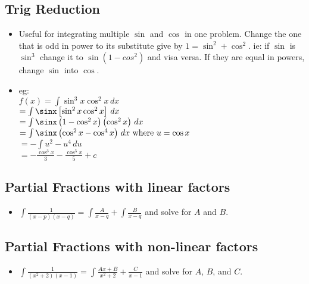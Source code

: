  \subsection{\color{BrickRed}Trig Reduction}
  \begin{multicols}{2}
  \begin{itemize}
    \item Useful for integrating multiple $\sin$ and $\cos$ in
     one problem. Change the one that is odd in power to its
     substitute give by $1=\sin^2+\cos^2$. ie: if $\sin$ is
     $\sin^3$ change it to $\sin \left(1-cos^2\right)$ and
     visa versa. If they are equal in powers, change $\sin$
     into $\cos$.\\
  \columnbreak
    \item eg:\\
    $f(x)=\int \sin^3x\cos^2x\,dx$\\
    $=\int \sinx \left[ \sin^2x\cos^2x \right]\,dx$\\
    $=\int \sinx\left( 1-\cos^2x
    \right)\left(\cos^2x\right)\,dx$\\
    $=\int \sinx\left( \cos^2x-\cos^4x\right)\,dx\text{
    where } u=\cos x$\\
    $=-\int u^2-u^4 \, du$\\
    $=-\frac{\cos^3x}{3}-\frac{\cos^5x}{5}+c$
  \end{itemize}
  \end{multicols}
  \subsection{\color{BrickRed}Partial Fractions with linear
  factors}
  \begin{itemize}
    \item
    $\int\frac{1}{\left(x-p\right)\left(x-q\right)}=\int\frac{A}{x-q}+\int\frac{B}{x-q}$
    and solve for $A$ and $B$.\\
  \end{itemize}
  \subsection{\color{BrickRed}Partial Fractions with non-linear
  factors}
  \begin{itemize}
    \item
    $\int\frac{1}{\left(x^2+2\right)\left(x-1\right)}=\int\frac{Ax+B}{x^2+2}+\frac{C}{x-1}$
    and solve for $A$, $B$, and $C$.
  \end{itemize}
